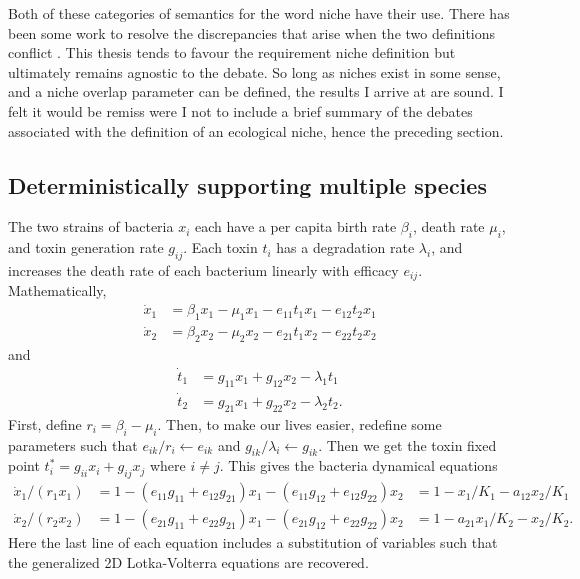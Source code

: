 \documentclass[a4paper,11pt]{article}
\numberwithin{equation}{section} %
\begin{document}
Both of these categories of semantics for the word niche have their use. 
There has been some work to resolve the discrepancies that arise when the two definitions conflict \cite{Leibold1995,Leibold2006}. 
This thesis tends to favour the requirement niche definition but ultimately remains agnostic to the debate. 
So long as niches exist in some sense, and a niche overlap parameter can be defined, the results I arrive at are sound. 
I felt it would be remiss were I not to include a brief summary of the debates associated with the definition of an ecological niche, hence the preceding section. 


\subsection{Deterministically supporting multiple species}

The two strains of bacteria $x_i$ each have a per capita birth rate $\beta_i$, death rate $\mu_i$, and toxin generation rate $g_{ij}$. 
Each toxin $t_i$ has a degradation rate $\lambda_i$, and increases the death rate of each bacterium linearly with efficacy $e_{ij}$. 
Mathematically, 
\begin{align*}
\dot{x}_1 &= \beta_1 x_1 - \mu_1 x_1 - e_{11} t_1 x_1 - e_{12} t_2 x_1 \\
\dot{x}_2 &= \beta_2 x_2 - \mu_2 x_2 - e_{21} t_1 x_2 - e_{22} t_2 x_2
\end{align*}
and
\begin{align*}
\dot{t}_1 &= g_{11}x_1+g_{12}x_2 - \lambda_1 t_1 \\
\dot{t}_2 &= g_{21}x_1+g_{22}x_2 - \lambda_2 t_2.
\end{align*}
First, define $r_i = \beta_i-\mu_i$. 
Then, to make our lives easier, redefine some parameters such that $e_{ik}/r_i \leftarrow e_{ik}$ and $g_{ik}/\lambda_i \leftarrow g_{ik}$. 
Then we get the toxin fixed point $t^*_i=g_{ii}x_i+g_{ij}x_j$ where $i\neq j$. This gives the bacteria dynamical equations
\begin{align*}
\dot{x}_1/(r_1 x_1) &= 1 - (e_{11}g_{11}+e_{12}g_{21}) x_1 - (e_{11}g_{12}+e_{12}g_{22}) x_2 &= 1 - x_1/K_1 - a_{12}x_2/K_1 \\
\dot{x}_2/(r_2 x_2) &= 1 - (e_{21}g_{11}+e_{22}g_{21}) x_1 - (e_{21}g_{12}+e_{22}g_{22}) x_2 &= 1 - a_{21}x_1/K_2 - x_2/K_2. 
\end{align*}
Here the last line of each equation includes a substitution of variables such that the generalized 2D Lotka-Volterra equations are recovered. 
\end{document}
